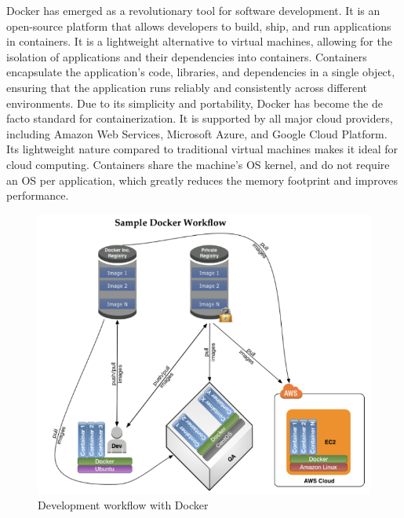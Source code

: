 Docker has emerged as a revolutionary tool for software development. It is an open-source platform that allows developers to build, ship, and run applications in containers. It is a lightweight alternative to virtual machines, allowing for the isolation of applications and their dependencies into containers. Containers encapsulate the application's code, libraries, and dependencies in a single object, ensuring that the application runs reliably and consistently across different environments.
Due to its simplicity and portability, Docker has become the de facto standard for containerization. It is supported by all major cloud providers, including Amazon Web Services, Microsoft Azure, and Google Cloud Platform. Its lightweight nature compared to traditional virtual machines makes it ideal for cloud computing. Containers share the machine's OS kernel, and do not require an OS per application, which greatly reduces the memory footprint and improves performance. \cite{merkel2014docker} 

\begin{figure}[ht]
    \centering
    \includegraphics[width=0.8\linewidth]{images/docker.png} 
    \caption{Development workflow with Docker}
    \label{fig:docker}
\end{figure}

